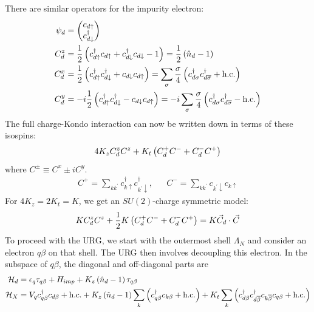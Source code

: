 \documentclass[12pt,twoside]{article}
\numberwithin{equation}{section}
\begin{document}
There are similar operators for the impurity electron:
\begin{equation}\begin{aligned}
\psi_d &= \begin{pmatrix} c_{d\uparrow} \\ c^\dagger_{d\downarrow} \end{pmatrix}\\
C^z_d &= \frac{1}{2}\left( c^\dagger_{d\uparrow}c_{d \uparrow} + c^\dagger_{d\downarrow}c_{d \downarrow} - 1  \right) = \frac{1}{2}\left( \hat n_d - 1 \right) \\
C^x_d &= \frac{1}{2}\left(c^\dagger_{d\uparrow}c^\dagger_{d \downarrow} + c_{d\downarrow}c_{d \uparrow} \right) = \sum_\sigma \frac{\sigma}{4}\left( c^\dagger_{d\sigma}c^\dagger_{d\overline\sigma} + \text{h.c.} \right) \\
C^y_d &= -i \frac{1}{2}\left(c^\dagger_{d\uparrow}c^\dagger_{d \downarrow} - c_{d\downarrow}c_{d \uparrow} \right) = -i\sum_\sigma \frac{\sigma}{4}\left( c^\dagger_{d\sigma}c^\dagger_{d\overline\sigma} - \text{h.c.} \right)\\
\end{aligned}\end{equation}
The full charge-Kondo interaction can now be written down in terms of these isospins:
\begin{equation}\begin{aligned}
4K_z C_d^z C^z + K_t \left({C_d^+ C^-+ C_d^- C^+}\right)
\end{aligned}\end{equation}
where \(C^\pm \equiv C^x \pm iC^y\).
\begin{equation}\begin{aligned}
	C^+ = \sum_{kk^\prime} c^\dagger_{k\uparrow}c^\dagger_{k^\prime\downarrow}, && C^- = \sum_{kk^\prime}c_{k^\prime\downarrow}c_{k\uparrow}
\end{aligned}\end{equation}
For \(4K_z = 2K_t=K\), we get an \(SU(2)\)-charge symmetric model:
\begin{equation}\begin{aligned}
K C_d^z C^z + \frac{1}{2} K \left({C_d^+ C^-+ C_d^- C^+}\right) = K \vec C_d \cdot \vec C
\end{aligned}\end{equation}
To proceed with the URG, we start with the outermost shell \(\Lambda_N\) and consider an electron \(q\beta\) on that shell.
The URG then involves decoupling this electron.
In the subspace of \(q\beta\), the diagonal and off-diagonal parts are
\begin{equation}\begin{aligned}
	\mathcal{H}_d &= \epsilon_q \tau_{q\beta} + H_{imp} + K_z \left({\hat n_d -1}\right)\tau_{q\beta}\\
	\mathcal{H}_X &= V_qc^\dagger_{q\beta}c_{d\beta} + \text{h.c.} + K_z \left({\hat n_d -1}\right)\sum_k \left({c^\dagger_{q\beta}c_{k\beta} + \text{h.c.}}\right) + K_t \sum_k \left({c^\dagger_{d\beta}c^\dagger_{d\overline\beta}c_{k\overline\beta}c_{q\beta} + \text{h.c.}}\right) \\
\end{aligned}\end{equation}
\end{document}
